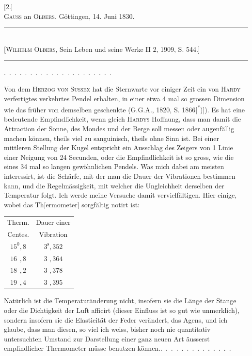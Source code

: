 \clearpage\begingroup{}
\begin{center}
[2.]\\[.7em]
\textsc{Gauss} an \textsc{Olbers}. Göttingen, 14. Juni 1830.
\par\smallskip\rule{.72\textwidth}{.35pt}\\
{\small [\textsc{Wilhelm Olbers}, Sein Leben und seine Werke II 2, 1909, S. 544.]}\\
\rule{.72\textwidth}{.35pt}
\end{center}
\noindent .\ .\ .\ .\ .\ .\ .\ .\ .\ .\ .\ .\ .\ .\ .\ .\ .\ .\ .\ .\ .
\par\noindent\hspace*{\parindent}Von dem \textsc{Herzog von Sussex} hat die Sternwarte vor einiger Zeit ein von
\textsc{Hardy} verfertigtes verkehrtes Pendel erhalten, in einer etwa 4 mal so grossen
Dimension wie das früher von demselben geschenkte (G.G.A., 1820, S. 1866[\textsuperscript{*})]\begingroup\renewcommand{\thefootnote}{}\endgroup).
Es hat eine bedeutende Empfindlichkeit, wenn gleich \textsc{Hardys} Hoffnung, dass
man damit die Attraction der Sonne, des Mondes und der Berge soll messen
oder augenfällig machen können, theils viel zu sanguinisch, theils ohne Sinn
ist. Bei einer mittleren Stellung der Kugel entspricht ein Ausschlag des
Zeigers von 1 Linie einer Neigung von 24 Secunden, oder die Empfindlichkeit
ist so gross, wie die eines 34 mal so langen gewöhnlichen Pendels. Was mich
dabei am meisten interessirt, ist die Schärfe, mit der man die Dauer der
Vibrationen bestimmen kann, und die Regelmässigkeit, mit welcher die Ungleichheit
derselben der Temperatur folgt. Ich werde meine Versuche damit
vervielfältigen. Hier einige, wobei das Th[ermometer] sorgfältig notirt ist:
\begin{center}
\begin{tabular}{c|c}
\hline\hline
Therm. & Dauer einer\\
Centes. & Vibration\\
\hline\hline
\(15^0{,}8\) & \(3^{\mathrm{s}}{,}352\)\\
\(16\phantom{^0}{,}8\) & \(3\phantom{^{\mathrm{s}}}{,}364\)\\
\(18\phantom{^0}{,}2\) & \(3\phantom{^{\mathrm{s}}}{,}378\)\\
\(19\phantom{^0}{,}4\) & \(3\phantom{^{\mathrm{s}}}{,}395\)
\end{tabular}
\end{center}
\clearpage{}
\noindent\hspace*{\parindent}Natürlich ist die Temperaturänderung nicht, insofern sie die Länge der
Stange oder die Dichtigkeit der Luft afficirt (dieser Einfluss ist so gut wie
unmerklich), sondern insofern sie die Elasticität der Feder verändert, das
Agens, und ich glaube, dass man diesen, so viel ich weiss, bisher noch nie
quantitativ untersuchten Umstand zur Darstellung einer ganz neuen Art äusserst
empfindlicher Thermometer müsse benutzen können.\quad .\ .\ .\ .\ .\ .\ .\ .\ .\ .\ .\ .\ .\ .
\clearpage\endgroup
